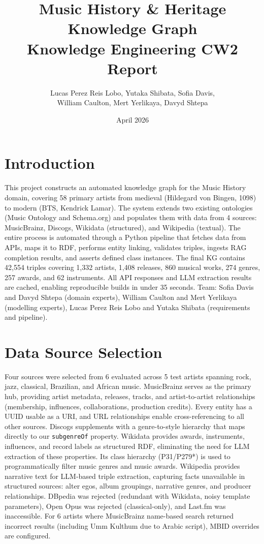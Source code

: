 \documentclass[11pt,a4paper]{article}
\title{Music History \& Heritage Knowledge Graph\\[0.3em]\large Knowledge Engineering CW2 Report}
\author{Lucas Perez Reis Lobo, Yutaka Shibata, Sofia Davis, \\ William Caulton, Mert Yerlikaya, Davyd Shtepa}
\date{April 2026}
\begin{document}
\maketitle

\section{Introduction}

This project constructs an automated knowledge graph for the Music History domain, covering 58 primary artists from medieval (Hildegard von Bingen, 1098) to modern (BTS, Kendrick Lamar). The system extends two existing ontologies (Music Ontology and Schema.org) and populates them with data from 4 sources: MusicBrainz, Discogs, Wikidata (structured), and Wikipedia (textual). The entire process is automated through a Python pipeline that fetches data from APIs, maps it to RDF, performs entity linking, validates triples, ingests RAG completion results, and asserts defined class instances. The final KG contains 42,554 triples covering 1,332 artists, 1,408 releases, 860 musical works, 274 genres, 257 awards, and 62 instruments. All API responses and LLM extraction results are cached, enabling reproducible builds in under 35 seconds. Team: Sofia Davis and Davyd Shtepa (domain experts), William Caulton and Mert Yerlikaya (modelling experts), Lucas Perez Reis Lobo and Yutaka Shibata (requirements and pipeline).

\section{Data Source Selection}

Four sources were selected from 6 evaluated across 5 test artists spanning rock, jazz, classical, Brazilian, and African music. MusicBrainz serves as the primary hub, providing artist metadata, releases, tracks, and artist-to-artist relationships (membership, influences, collaborations, production credits). Every entity has a UUID usable as a URI, and URL relationships enable cross-referencing to all other sources. Discogs supplements with a genre-to-style hierarchy that maps directly to our \texttt{subgenreOf} property. Wikidata provides awards, instruments, influences, and record labels as structured RDF, eliminating the need for LLM extraction of these properties. Its class hierarchy (P31/P279*) is used to programmatically filter music genres and music awards. Wikipedia provides narrative text for LLM-based triple extraction, capturing facts unavailable in structured sources: alter egos, album groupings, narrative genres, and producer relationships. DBpedia was rejected (redundant with Wikidata, noisy template parameters), Open Opus was rejected (classical-only), and Last.fm was inaccessible. For 6 artists where MusicBrainz name-based search returned incorrect results (including Umm Kulthum due to Arabic script), MBID overrides are configured.
\end{document}
